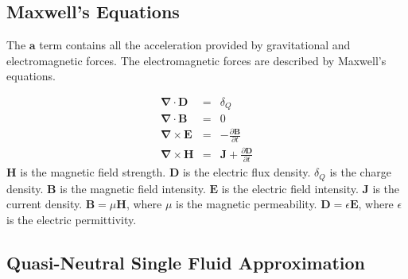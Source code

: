 
\subsection{Maxwell's Equations}

The $\mathbf{a} $ term contains all the acceleration provided by gravitational and electromagnetic forces. The electromagnetic forces are described by Maxwell's equations.

\begin{eqnarray*}
\boldsymbol{\nabla} \cdot\mathbf{D} &= & {\delta}_Q \\
\boldsymbol{\nabla} \cdot\mathbf{B} &=&0 \\
\boldsymbol{\nabla} \times\mathbf{E} &=& -\frac{\partial \mathbf{B}}{\partial t} \\
\boldsymbol{\nabla} \times\mathbf{H} &=&  \mathbf{J}+ \frac{\partial \mathbf{D}}{\partial t}
\end{eqnarray*}
$\mathbf{H}$ is the magnetic field strength.
$\mathbf{D}$ is the electric flux density.
${\delta}_Q$ is the charge density.
$\mathbf{B}$ is the magnetic field intensity.
$\mathbf{E}$ is the electric field intensity.
$\mathbf{J}$ is the current density.
$\mathbf{B} = \mu \mathbf{H}$, where $\mu$ is the magnetic permeability.
$\mathbf{D} = \epsilon \mathbf{E}$, where $\epsilon$ is the electric permittivity.


\subsection{Quasi-Neutral Single Fluid Approximation}

